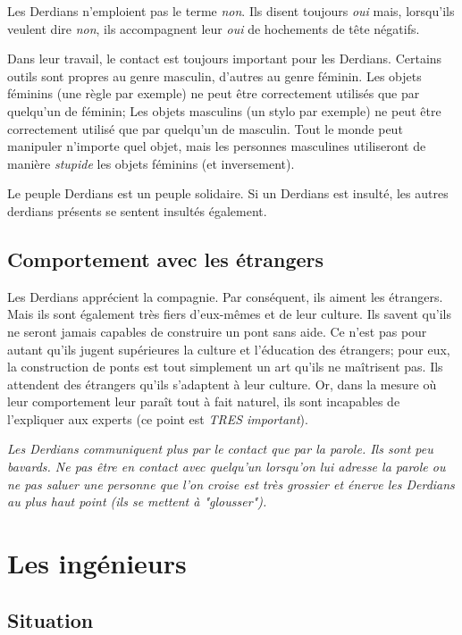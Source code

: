 \documentclass[11pt,a4paper]{article}
\begin{document}
{Les Derdians n'emploient pas le terme \emph{non}. Ils disent toujours \emph{oui} mais, lorsqu'ils veulent dire \emph{non}, ils accompagnent leur \emph{oui} de hochements de tête négatifs.

Dans leur travail, le contact est toujours important pour les Derdians.
Certains outils sont propres au genre masculin, d'autres au genre féminin.
Les objets féminins (une règle par exemple) ne peut être correctement utilisés que par quelqu'un de féminin; Les objets masculins (un stylo par exemple) ne peut être correctement utilisé que par quelqu'un de masculin.
Tout le monde peut manipuler n'importe quel objet, mais les personnes masculines utiliseront de manière \emph{stupide} les objets féminins (et inversement).

Le peuple Derdians est un peuple solidaire. Si un Derdians est insulté, les autres derdians présents se sentent insultés également.
 
 \subsection{Comportement avec les étrangers}
 
 Les Derdians apprécient la compagnie.
 Par conséquent, ils aiment les étrangers.
 Mais ils sont également très fiers d'eux-mêmes et de leur culture.
 Ils savent qu'ils ne seront jamais capables de construire un pont sans aide.
 Ce n'est pas pour autant qu'ils jugent supérieures la culture et l'éducation des étrangers; pour eux, la construction de ponts est tout simplement un art qu'ils ne maîtrisent pas.
 Ils attendent des étrangers qu'ils s'adaptent à leur culture.
 Or, dans la mesure où leur comportement leur paraît tout à fait naturel, ils sont incapables de l'expliquer aux experts (ce point est \emph{TRES important}).

 \emph{Les Derdians communiquent plus par le contact que par la parole. Ils sont peu bavards. Ne pas être en contact avec quelqu'un lorsqu'on lui adresse la parole ou ne pas saluer une personne que l'on croise est très grossier et énerve les Derdians au plus haut point (ils se mettent à "glousser").}

\pagebreak
}
 
\section{Les ingénieurs}

\subsection{Situation}
\end{document}
